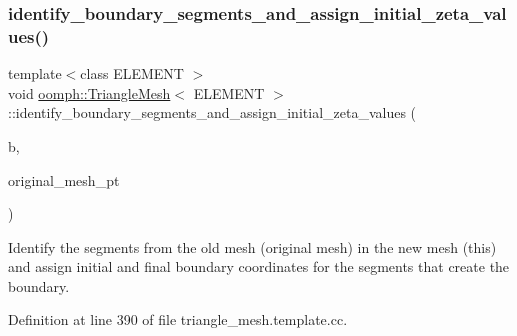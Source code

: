 \mbox{\label{classoomph_1_1TriangleMesh_ad79adab8a5da9c9fff26bfeeb019f102}} 
\subsubsection{\texorpdfstring{identify\+\_\+boundary\+\_\+segments\+\_\+and\+\_\+assign\+\_\+initial\+\_\+zeta\+\_\+values()}{identify\_boundary\_segments\_and\_assign\_initial\_zeta\_values()}\hspace{0.1cm}{\footnotesize\ttfamily [2/2]}}
{\footnotesize\ttfamily template$<$class E\+L\+E\+M\+E\+NT $>$ \\
void \hyperlink{classoomph_1_1TriangleMesh}{oomph\+::\+Triangle\+Mesh}$<$ E\+L\+E\+M\+E\+NT $>$\+::identify\+\_\+boundary\+\_\+segments\+\_\+and\+\_\+assign\+\_\+initial\+\_\+zeta\+\_\+values (\begin{DoxyParamCaption}\item[{const unsigned \&}]{b,  }\item[{\hyperlink{classoomph_1_1TriangleMesh}{Triangle\+Mesh}$<$ E\+L\+E\+M\+E\+NT $>$ $\ast$}]{original\+\_\+mesh\+\_\+pt }\end{DoxyParamCaption})}



Identify the segments from the old mesh (original mesh) in the new mesh (this) and assign initial and final boundary coordinates for the segments that create the boundary. 



Definition at line 390 of file triangle\+\_\+mesh.\+template.\+cc.



